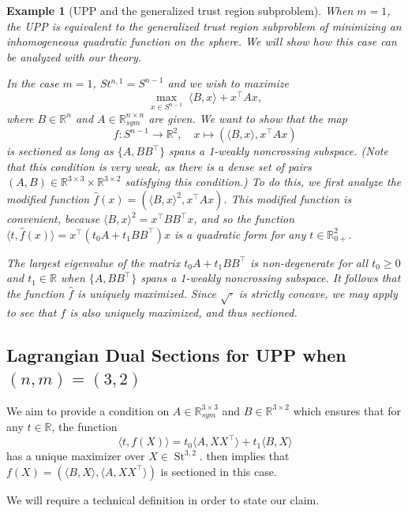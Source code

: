 \documentclass{article}
\numberwithin{equation}{section}
\newcommand{\R}{\mathbb{R}}
\newtheorem{example}{Example}[section]
\DeclareMathOperator{\St}{St}
\begin{document}
\begin{example}[UPP and the generalized trust region subproblem]
\label{ex:UPP1}
When $m=1$, the UPP is equivalent to the generalized trust region subproblem of minimizing an inhomogeneous quadratic function on the sphere. We will show how this case can be analyzed with our theory.


In the case $m= 1$, $St^{n,1} = S^{n-1}$ and we wish to maximize
\[
    \max_{x \in S^{n-1}}\;\langle B, x\rangle + x^{\intercal}Ax,
\]
where $B \in \R^n$ and $A \in \R^{n\times n}_{sym}$ are given.
We want to show that the map 
\[
f : S^{n-1} \rightarrow \R^2,\quad x\mapsto  (\langle B, x\rangle, x^{\intercal}Ax)
\] 
is sectioned as long as $\{A, BB^{\intercal}\}$ spans a 1-weakly noncrossing subspace. (Note that this condition is very weak, as there is a dense set of pairs $(A, B) \in \R^{3\times 3} \times \R^{3\times 2}$ satisfying this condition.)
To do this, we first analyze the modified function $\hat{f}(x) =(\langle B, x\rangle^2, x^{\intercal}Ax)$. This modified function is convenient, because  $\langle B, x\rangle^2 = x^{\intercal}BB^{\intercal}x$, and so the function $\langle t, \hat{f}(x)\rangle = x^{\intercal}(t_0A + t_1BB^{\intercal})x$ 
is a quadratic form for any $t \in \R^{2}_{0+}$.

The largest eigenvalue of the matrix $t_0 A + t_1 BB^{\intercal}$ is non-degenerate for all $t_0 \ge 0$ and  $t_1 \in \R$ when $\{A, BB^{\intercal}\}$ spans a 1-weakly noncrossing subspace. It follows that the function $\hat{f}$ is uniquely maximized.
Since $\sqrt{\cdot}$ is strictly concave, we may apply  to see that $f$ is also uniquely maximized, and thus sectioned.
\end{example}


\subsection{Lagrangian Dual Sections for UPP when $(n,m) = (3,2)$}

We aim to provide a
condition on $A \in \R_{sym}^{3 \times 3}$ and $B \in \R^{3 \times 2}$ which ensures that for any $t \in \R$, the function 
\[
\langle t, f(X)\rangle = t_0\langle A, XX^{\intercal}\rangle + t_1\langle B, X\rangle
\]
has a unique maximizer over $X \in \St^{3,2}$.  then implies that $f(X) = (\langle B, X\rangle, \langle A, XX^{\intercal}\rangle)$ is sectioned in this case.


We will require a technical definition in order to state our claim.
\end{document}
